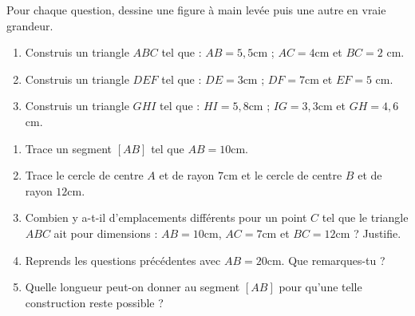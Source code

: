\documentclass[a4paper,10pt]{report}
\begin{document}
\begin{ex}
Pour chaque question, dessine une figure à main levée puis une autre en vraie grandeur.
\begin{enumerate}
\item Construis un triangle $ABC$ tel que : $AB= 5,5$cm ; $AC= 4$cm et $BC=2$ cm.
\item Construis un triangle $DEF$ tel que : $DE= 3$cm ; $DF= 7$cm et $EF= 5$ cm.
\item Construis un triangle $GHI$ tel que : $HI = 5,8$cm ; $IG= 3,3$cm et $GH= 4,6$cm.
\end{enumerate}
\end{ex}

\begin{ex}

\medskip
\begin{enumerate}
\item Trace un segment $[AB]$ tel que $AB=10$cm.
\item Trace le cercle de centre $A$ et de rayon $7$cm et le cercle de centre $B$ et de rayon $12$cm.
\item Combien y a-t-il d'emplacements différents pour un point $C$ tel que le triangle $ABC$ ait pour dimensions : $AB= 10$cm, $AC=7$cm et $BC= 12$cm ? Justifie.
\item Reprends les questions précédentes avec $AB=20$cm. Que remarques-tu ?
\item Quelle longueur peut-on donner au segment $[AB]$ pour qu'une telle construction reste possible ?
\end{enumerate}
\end{ex}
\end{document}
